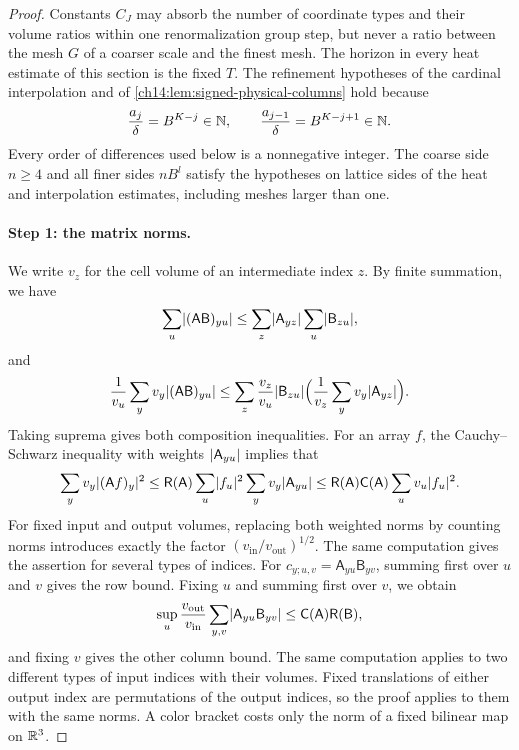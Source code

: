 \begin{proof}
Constants $C_J$ may absorb the number of coordinate types and their volume ratios within one renormalization group step, but never a ratio between the mesh $G$ of a coarser scale and the finest mesh. The horizon in every heat estimate of this section is the fixed $T$. The refinement hypotheses of the cardinal interpolation and of \cref{ch14:lem:signed-physical-columns} hold because
\begin{equation}\label{ch24:eq:integer-refinements}
 \frac{a_j}{\delta}=B^{K-j}\in\mathbb N,\qquad \frac{a_{j-1}}{\delta}=B^{K-j+1}\in\mathbb N.
\end{equation}
Every order of differences used below is a nonnegative integer. The coarse side $n\ge4$ and all finer sides $nB^l$ satisfy the hypotheses on lattice sides of the heat and interpolation estimates, including meshes larger than one.

\paragraph{Step 1: the matrix norms.}
We write $v_z$ for the cell volume of an intermediate index $z$. By finite summation, we have
\[
 \sum_u\lvert (\mathsf A\mathsf B)_{yu}\rvert\le\sum_z\lvert \mathsf A_{yz}\rvert\sum_u\lvert \mathsf B_{zu}\rvert,
\]
and
\[
 \frac1{v_u}\sum_yv_y\lvert (\mathsf A\mathsf B)_{yu}\rvert\le\sum_z\frac{v_z}{v_u}\lvert \mathsf B_{zu}\rvert\Bigl(\frac1{v_z}\sum_yv_y\lvert \mathsf A_{yz}\rvert\Bigr).
\]
Taking suprema gives both composition inequalities. For an array $f$, the Cauchy--Schwarz inequality with weights $\lvert \mathsf A_{yu}\rvert$ implies that
\[
 \sum_yv_y\lvert (\mathsf Af)_y\rvert^2\le\mathsf R(\mathsf A)\sum_u\lvert f_u\rvert^2\sum_yv_y\lvert \mathsf A_{yu}\rvert\le\mathsf R(\mathsf A)\mathsf C(\mathsf A)\sum_uv_u\lvert f_u\rvert^2.
\]
For fixed input and output volumes, replacing both weighted norms by counting norms introduces exactly the factor $(v_{\mathrm{in}}/v_{\mathrm{out}})^{1/2}$. The same computation gives the assertion for several types of indices. For $c_{y;u,v}=\mathsf A_{yu}\mathsf B_{yv}$, summing first over $u$ and $v$ gives the row bound. Fixing $u$ and summing first over $v$, we obtain
\[
 \sup_u\frac{v_{\mathrm{out}}}{v_{\mathrm{in}}}\sum_{y,v}\lvert \mathsf A_{yu}\mathsf B_{yv}\rvert\le\mathsf C(\mathsf A)\mathsf R(\mathsf B),
\]
and fixing $v$ gives the other column bound. The same computation applies to two different types of input indices with their volumes. Fixed translations of either output index are permutations of the output indices, so the proof applies to them with the same norms. A color bracket costs only the norm of a fixed bilinear map on $\mathbb R^3$.


\end{proof}
